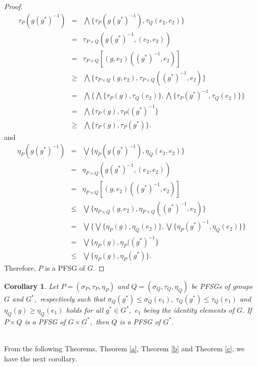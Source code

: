 \documentclass[12pt,letterpaper]{amsart}
\theoremstyle{plain}
\newtheorem{corollary}{Corollary}[section]
\theoremstyle{definition}
\numberwithin{equation}{section}
\begin{document}
\begin{proof}
\begin{eqnarray*}
\tau_P(g (g^*)^{-1}) & = & \bigwedge \lbrace \tau_P(g (g^*)^{-1}), \tau_Q(e_2, e_2) \rbrace\\
& = & \tau_{P \times Q}(g (g^*)^{-1}, (e_2, e_2))\\
& = & \tau_{P \times Q}[(g, e_2)((g^*)^{-1}, e_2)]\\
& \geq & \bigwedge \lbrace \tau_{P \times Q}(g, e_2), \tau_{P \times Q}((g^*)^{-1}, e_2) \rbrace\\
& = & \bigwedge \lbrace \bigwedge\lbrace \tau_P(g), \tau_Q(e_2)\rbrace, \bigwedge\lbrace \tau_P(g^*)^{-1}, \tau_Q(e_2) \rbrace \rbrace\\
& = & \bigwedge\lbrace \tau_P(g), \tau_P((g^*)^{-1} \rbrace\\
& \geq & \bigwedge\lbrace \tau_P(g), \tau_P(g^*) \rbrace. 
\end{eqnarray*}
and
\begin{eqnarray*}
\eta_P(g (g^*)^{-1}) & = & \bigvee \lbrace \eta_P(g (g^*)^{-1}), \eta_Q(e_2, e_2) \rbrace\\
& = & \eta_{P \times Q}(g (g^*)^{-1}, (e_2, e_2))\\
& = & \eta_{P \times Q}[(g, e_2)((g^*)^{-1}, e_2)]\\
& \leq & \bigvee \lbrace \eta_{P \times Q}(g, e_2), \eta_{P \times Q}((g^*)^{-1}, e_2) \rbrace\\
& = & \bigvee \lbrace \bigvee\lbrace \eta_P(g), \eta_Q(e_2)\rbrace, \bigvee\lbrace \eta_P(g^*)^{-1}, \eta_Q(e_2) \rbrace \rbrace\\
& = & \bigvee\lbrace \eta_P(g), \eta_P((g^*)^{-1} \rbrace\\
& \leq & \bigvee\lbrace \eta_P(g), \eta_P(g^*) \rbrace. 
\end{eqnarray*}
Therefore, $P$ is a PFSG of $G.$
\end{proof}

\begin{corollary}
Let $P = (\sigma_P, \tau_P, \eta_P)$ and $Q = (\sigma_Q, \tau_Q, \eta_Q)$ be PFSGs of groups $G$ and $G^{*},$ respectively such that $\sigma_Q(g^*) \leq \sigma_Q(e_1),~ \tau_Q(g^*) \leq \tau_Q(e_1)$ and $\eta_Q(g) \geq \eta_Q(e_1)$ holds for all $g^* \in G^*,$ $e_1$ being the identity elements of $G.$ If $P \times Q$ is a PFSG of $G \times G^*,$ then $Q$ is a PFSG of $G^*.$
\end{corollary}
\ \\
From the following Theorems, Theorem \ref{a}, Theorem \ref{b} and Theorem \ref{c}, we have the next corollary.
\end{document}
